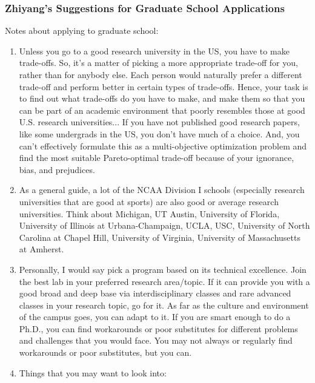 \subsubsection{\hspace{0.1in} Zhiyang's Suggestions for Graduate School Applications}
\label{zygradschapps}

Notes about applying to graduate school: \vspace{-0.3cm}
\begin{enumerate} \itemsep -4pt
\item Unless you go to a good research university in the US, you have to make trade-offs. So, it's a matter of picking a more appropriate trade-off for you, rather than for anybody else. Each person would naturally prefer a different trade-off and perform better in certain types of trade-offs. Hence, your task is to find out what trade-offs do you have to make, and make them so that you can be part of an academic environment that poorly resembles those at good U.S. research universities...  If you have not published good research papers, like some undergrads in the US, you don't have much of a choice. And, you can't effectively formulate this as a multi-objective optimization problem and find the most suitable Pareto-optimal trade-off because of your ignorance, bias, and prejudices.
\item As a general guide, a lot of the NCAA Division I schools (especially research universities that are good at sports) are also good or average research universities. Think about Michigan, UT Austin, University of Florida, University of Illinois at Urbana-Champaign, UCLA, USC, University of North Carolina at Chapel Hill, University of Virginia, University of Massachusetts at Amherst.
\item Personally, I would say pick a program based on its technical excellence. Join the best lab in your preferred research area/topic. If it can provide you with a good broad and deep base via interdisciplinary classes and rare advanced classes in your research topic, go for it. As far as the culture and environment of the campus goes, you can adapt to it. If you are smart enough to do a Ph.D., you can find workarounds or poor substitutes for different problems and challenges that you would face. You may not always or regularly find workarounds or poor substitutes, but you can.
\item Things that you may want to look into: \vspace{-0.3cm}
	\begin{enumerate} \itemsep -2pt

\end{enumerate}
\end{enumerate}
